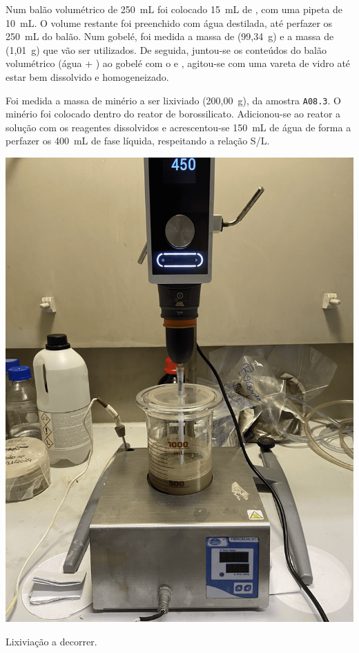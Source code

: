 Num balão volumétrico de 250~mL foi colocado 15~mL de \AMO{}, com uma pipeta de 10~mL\@.
O volume restante foi preenchido com água destilada, até perfazer os 250~mL do balão.
Num gobelé, foi medida a massa de \TSP{} (99,34~g) e a massa de \SCP{} (1,01~g) que vão ser utilizados.
De seguida, juntou-se os conteúdos do balão volumétrico (água + \AMO{}) ao gobelé com o \TSP{} e \SCP{}, agitou-se com uma vareta de vidro até estar bem dissolvido e homogeneizado.

Foi medida a massa de minério a ser lixiviado (200,00~g), da amostra \texttt{A08.3}.
O minério foi colocado dentro do reator de borossilicato.
Adicionou-se ao reator a solução com os reagentes dissolvidos e acrescentou-se 150~mL de água de forma a perfazer os 400~mL de fase líquida, respeitando a relação S/L\@.

\begin{marginfigure}[-8\baselineskip]
    \centering
    \includegraphics[width=0.9\linewidth]{figures/lixiviação-1 a decorrer}
    \caption{Lixiviação a decorrer.}
    \label{fig:lixiviacao1-a-decorrer}
\end{marginfigure}

